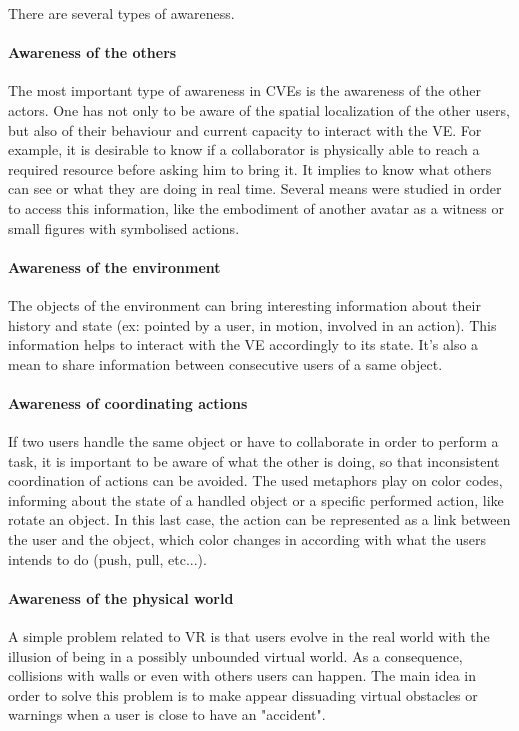 \documentclass[a4paper]{article}
\begin{document}
There are several types of awareness.

\paragraph{Awareness of the others}
The most important type of awareness in CVEs is the awareness of the other actors. One has not only to be aware of the spatial localization of the other users, but also of their behaviour and current capacity to interact with the VE. For example, it is desirable to know if a collaborator is physically able to reach a required resource before asking him to bring it. It implies to know what others can see or what they are doing in real time. Several means were studied in order to access this information, like the embodiment of another avatar as a witness or small figures with symbolised actions.

\paragraph{Awareness of the environment}
The objects of the environment can bring interesting information about their history and state (ex: pointed by a user, in motion, involved in an action). This information helps to interact with the VE accordingly to its state. It's also a mean to share information between consecutive users of a same object.

\paragraph{Awareness of coordinating actions}
If two users handle the same object or have to collaborate in order to perform a task, it is important to be aware of what the other is doing, so that inconsistent coordination of actions can be avoided. The used metaphors play on color codes, informing about the state of a handled object or a specific performed action, like rotate an object. In this last case, the action can be represented as a link between the user and the object, which color changes in according with what the users intends to do (push, pull, etc...).

\paragraph{Awareness of the physical world}
A simple problem related to VR is that users evolve in the real world with the illusion of being in a possibly unbounded virtual world. As a consequence, collisions with walls or even with others users can happen. The main idea in order to solve this problem is to make appear dissuading virtual obstacles or warnings when a user is close to have an "accident". 
\end{document}
